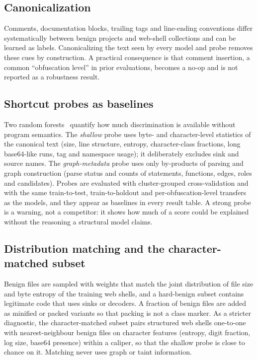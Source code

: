 \documentclass[pdflatex,sn-mathphys-num]{sn-jnl}
\begin{document}
\subsection{Canonicalization}\label{sec:p-canon}
Comments, documentation blocks, trailing tags and line-ending conventions
differ systematically between benign projects and web-shell collections and can
be learned as labels. Canonicalizing the text seen by every model and probe
removes these cues by construction. A practical consequence is that comment
insertion, a common ``obfuscation level'' in prior evaluations, becomes a
no-op and is not reported as a robustness result.

\subsection{Shortcut probes as baselines}\label{sec:p-probe}
Two random forests~\cite{breiman2001rf} quantify how much discrimination is
available without program semantics. The \emph{shallow} probe uses byte- and
character-level statistics of the canonical text (size, line structure,
entropy, character-class fractions, long base64-like runs, tag and namespace
usage); it deliberately excludes sink and source names. The
\emph{graph-metadata} probe uses only by-products of parsing and graph
construction (parse status and counts of statements, functions, edges, roles
and candidates). Probes are evaluated with cluster-grouped cross-validation and
with the same train-to-test, train-to-holdout and per-obfuscation-level
transfers as the models, and they appear as baselines in every result table.
A strong probe is a warning, not a competitor: it shows how much of a score
could be explained without the reasoning a structural model claims.

\subsection{Distribution matching and the character-matched subset}\label{sec:p-char}
Benign files are sampled with weights that match the joint distribution of file
size and byte entropy of the training web shells, and a hard-benign subset
contains legitimate code that uses sinks or decoders. A fraction of benign
files are added as minified or packed variants so that packing is not a class
marker. As a stricter diagnostic, the character-matched subset pairs structured
web shells one-to-one with nearest-neighbour benign files on character features
(entropy, digit fraction, log size, base64 presence) within a caliper, so that
the shallow probe is close to chance on it. Matching never uses graph or taint
information.
\end{document}
